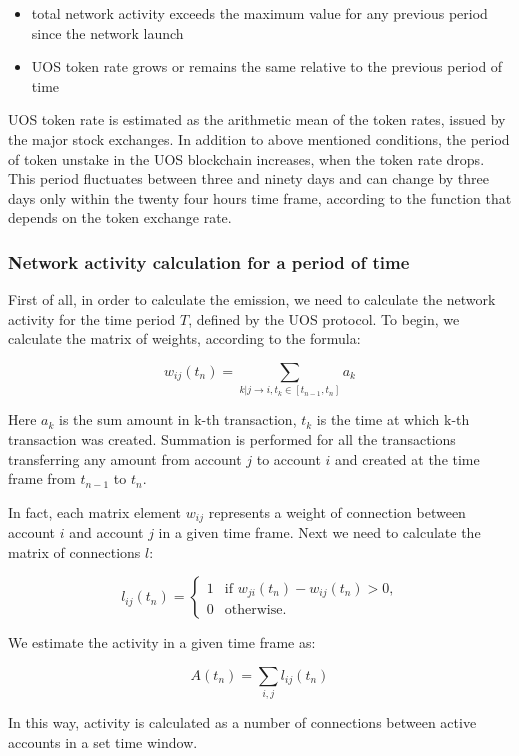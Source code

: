 \documentclass[a4paper,12pt]{article}
\begin{document}
\begin{itemize}
\item total network activity exceeds the maximum value for any previous period since the network launch
\item UOS token rate grows or remains the same relative to the previous period of time
\end{itemize}
UOS token rate is estimated as the arithmetic mean of the token rates, issued by the major stock exchanges. In addition to above mentioned conditions, the period of token unstake in the U{\degree}OS blockchain increases, when the token rate drops. This period fluctuates between three and ninety days and can change by three days only within the twenty four hours time frame, according to the function that depends on the token exchange rate.


\subsubsection{Network activity calculation for a period of time}
\label{networkact}
First of all, in order to calculate the emission, we need to calculate the network activity for the time period $T$, defined by the U{\degree}OS protocol. To begin, we calculate the matrix of weights, according to the formula:



$$
w_{ij}(t_n)=\sum_{k|j \to i, t_k \in [t_{n-1}, t_n]}a_k
$$

Here $a_k$  is the sum amount in k-th transaction, $t_k$ is the time at which k-th transaction was created. Summation is performed for all the transactions transferring any amount from account $j$ to account $i$ and created at the time frame from $t_{n-1}$ to $t_n$. 

In fact, each matrix element $w_{ij}$ represents a weight of connection between account $i$ and account $j$ in a given time frame. Next we need to calculate the matrix of connections $l$: 



$$
l_{ij}(t_n) = \begin{cases}
 1
 & \text{if $w_{ji}(t_n)-w_{ij}(t_n) > 0$,}\\
 0 & \text{otherwise.}
\end{cases}
$$

We estimate the activity in a given time frame as:



$$
A(t_n) = \sum_{i,j} l_{ij}(t_n)
$$

In this way, activity is calculated as a number of connections between active accounts in a set time window. 
\end{document}
